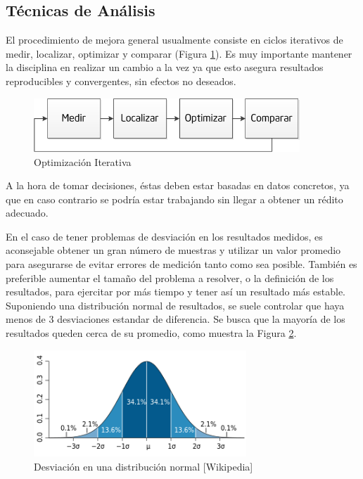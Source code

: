 \documentclass[a4paper]{report}
\begin{document}
\subsection{Técnicas de Análisis}

El procedimiento de mejora general usualmente consiste en ciclos iterativos de medir, localizar, optimizar y comparar (Figura \ref{fig:cycle}). 
Es muy importante mantener la disciplina en realizar un cambio a la vez ya que esto asegura resultados reproducibles y convergentes, sin efectos no deseados.

\begin{figure}[H]
\begin{center}
\includegraphics[width=10cm]{cycle.png}
\caption{Optimización Iterativa}
\label{fig:cycle}
\end{center}
\end{figure}

A la hora de tomar decisiones, éstas deben estar basadas en datos concretos, ya que en caso contrario se podría estar trabajando sin llegar a obtener un rédito adecuado.

\bigskip

En el caso de tener problemas de desviación en los resultados medidos, es aconsejable obtener un gran número de muestras y utilizar un valor promedio para asegurarse de evitar errores de
medición tanto como sea posible. También es preferible aumentar el tamaño del problema a resolver, o la definición de los resultados, para ejercitar por más tiempo y tener así un resultado 
más estable.
Suponiendo una distribución normal de resultados, se suele controlar que haya menos de 3 desviaciones estandar de diferencia. 
Se busca que la mayoría de los resultados queden cerca de su promedio, como muestra la Figura \ref{fig:deviation}.

\begin{figure}[H]
\centering
\includegraphics[width=8cm]{deviation.png}
\caption{Desviación en una distribución normal [Wikipedia]}
\label{fig:deviation}
\end{figure}
\end{document}
